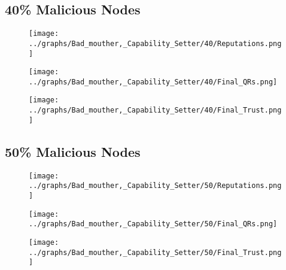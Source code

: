 \documentclass{article}
\begin{document}
  \begin{minipage}[t]{0.49\columnwidth}
    \subsection*{40\% Malicious Nodes}
        \begin{figure}[H]
            \centering
            \texttt{[image: ../graphs/Bad\_mouther,\_Capability\_Setter/40/Reputations.png]}
        \end{figure}
        \begin{figure}[H]
            \centering
            \texttt{[image: ../graphs/Bad\_mouther,\_Capability\_Setter/40/Final\_QRs.png]}
        \end{figure}
    \end{minipage}
    \begin{minipage}[t]{0.49\columnwidth}
        \begin{figure}[H]
            \centering
            \texttt{[image: ../graphs/Bad\_mouther,\_Capability\_Setter/40/Final\_Trust.png]}
        \end{figure}
    \end{minipage}

  \begin{minipage}[t]{0.49\columnwidth}
    \subsection*{50\% Malicious Nodes}
        \begin{figure}[H]
            \centering
            \texttt{[image: ../graphs/Bad\_mouther,\_Capability\_Setter/50/Reputations.png]}
        \end{figure}
        \begin{figure}[H]
            \centering
            \texttt{[image: ../graphs/Bad\_mouther,\_Capability\_Setter/50/Final\_QRs.png]}
        \end{figure}
    \end{minipage}
    \begin{minipage}[t]{0.49\columnwidth}
        \begin{figure}[H]
            \centering
            \texttt{[image: ../graphs/Bad\_mouther,\_Capability\_Setter/50/Final\_Trust.png]}
        \end{figure}
    \end{minipage}
\end{document}
